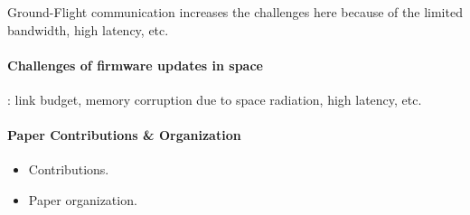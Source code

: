 Ground-Flight communication increases the challenges here because of the limited
bandwidth, high latency, etc.
\paragraph*{Challenges of firmware updates in space}: link budget, memory corruption
due to space radiation, high latency, etc.

\fi

\paragraph*{Paper Contributions \& Organization}

\begin{itemize}
\item Contributions.
\item Paper organization.
\end{itemize}

